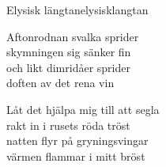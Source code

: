 \begin{song}{Elysisk längtan}{elysisklangtan}
\begin{vers}
Aftonrodnan svalka sprider\\
skymningen sig sänker fin\\
och likt dimridåer sprider\\
doften av det rena vin\\
\end{vers}
\begin{vers}
\repopen Låt det hjälpa mig till att segla\\
rakt in i rusets röda tröst\\
natten flyr på gryningsvingar\\
värmen flammar i mitt bröst \repclose\\
\end{vers}
\end{song}
